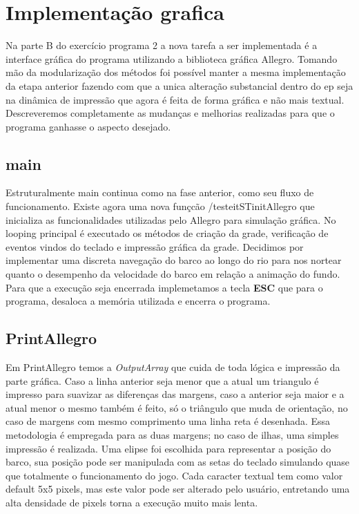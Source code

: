 \documentclass[a4paper,11pt]{article}
\begin{document}
\section{Implementa\c{c}ão grafica}
Na parte B do exercício programa 2 a nova tarefa a ser implementada é a interface gráfica do programa utilizando a biblioteca gráfica Allegro. Tomando mão da modularização dos métodos foi possível manter a mesma implementação da etapa anterior fazendo com que a unica alteração substancial dentro do ep seja na dinâmica de impressão que agora é feita de forma gráfica e não mais textual. Descreveremos completamente as mudanças e melhorias realizadas para que o programa ganhasse o aspecto desejado.

\subsection{main}
Estruturalmente main continua como na fase anterior, como seu fluxo de funcionamento. Existe agora uma nova funçcão /testeit{STinitAllegro} que inicializa as funcionalidades utilizadas pelo Allegro para simulação gráfica. No looping principal é executado os métodos de criação da grade, verificação de eventos vindos do teclado e impressão gráfica da grade. Decidimos por implementar uma discreta navegação do barco ao longo do rio para nos nortear quanto o desempenho da velocidade do barco em relação a animação do fundo. Para que a execução seja encerrada implemetamos a tecla \textbf{ESC} que para o programa, desaloca a memória utilizada e encerra o programa.
\subsection{PrintAllegro}
Em PrintAllegro temos a \textit{OutputArray} que cuida de toda lógica e impressão da parte gráfica. Caso a linha anterior seja menor que a atual um triangulo é impresso para suavizar as diferenças das margens, caso a anterior seja maior e a atual menor o mesmo também é feito, só o triângulo que muda de orientação, no caso de margens com mesmo comprimento uma linha reta é desenhada. Essa metodologia é empregada para as duas margens; no caso de ilhas, uma simples impressão é realizada.
Uma elipse foi escolhida para representar a posição do barco, sua posição pode ser manipulada com as setas do teclado simulando quase que totalmente o funcionamento do jogo. Cada caracter textual tem como valor default 5x5 pixels, mas este valor pode ser alterado pelo usuário, entretando uma alta densidade de pixels torna a execução muito mais lenta.
\end{document}
